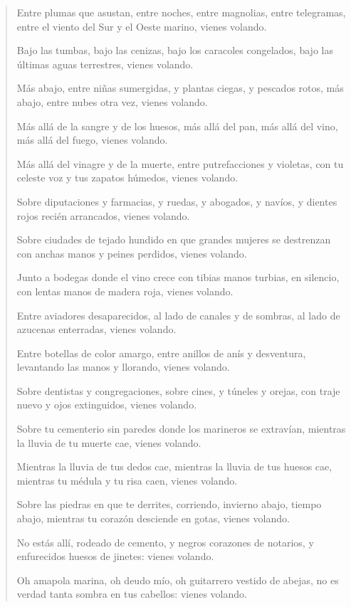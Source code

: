 \documentclass[12pt]{article}
\begin{document}
\clearpage
{}
\begin{verse}
Entre plumas que asustan, entre noches,
entre magnolias, entre telegramas,
entre el viento del Sur y el Oeste marino,
vienes volando.

Bajo las tumbas, bajo las cenizas,
bajo los caracoles congelados,
bajo las últimas aguas terrestres,
vienes volando.

Más abajo, entre niñas sumergidas,
y plantas ciegas, y pescados rotos,
más abajo, entre nubes otra vez,
vienes volando.

Más allá de la sangre y de los huesos,
más allá del pan, más allá del vino,
más allá del fuego,
vienes volando.

Más allá del vinagre y de la muerte,
entre putrefacciones y violetas,
con tu celeste voz y tus zapatos húmedos,
vienes volando.

Sobre diputaciones y farmacias,
y ruedas, y abogados, y navíos,
y dientes rojos recién arrancados,
vienes volando.

Sobre ciudades de tejado hundido
en que grandes mujeres se destrenzan
con anchas manos y peines perdidos,
vienes volando.

Junto a bodegas donde el vino crece
con tibias manos turbias, en silencio,
con lentas manos de madera roja,
vienes volando.

Entre aviadores desaparecidos,
al lado de canales y de sombras,
al lado de azucenas enterradas,
vienes volando.

Entre botellas de color amargo,
entre anillos de anís y desventura,
levantando las manos y llorando,
vienes volando.

Sobre dentistas y congregaciones,
sobre cines, y túneles y orejas,
con traje nuevo y ojos extinguidos,
vienes volando.

Sobre tu cementerio sin paredes
donde los marineros se extravían,
mientras la lluvia de tu muerte cae,
vienes volando.

Mientras la lluvia de tus dedos cae,
mientras la lluvia de tus huesos cae,
mientras tu médula y tu risa caen,
vienes volando.

Sobre las piedras en que te derrites,
corriendo, invierno abajo, tiempo abajo,
mientras tu corazón desciende en gotas,
vienes volando.

No estás allí, rodeado de cemento,
y negros corazones de notarios,
y enfurecidos huesos de jinetes:
vienes volando.

Oh amapola marina, oh deudo mío,
oh guitarrero vestido de abejas,
no es verdad tanta sombra en tus cabellos:
vienes volando.


\end{verse}
\end{document}
